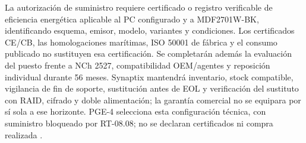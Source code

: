 La autorización de suministro requiere certificado o registro verificable de eficiencia energética aplicable al PC configurado y a MDF2701W-BK, identificando esquema, emisor, modelo, variantes y condiciones. Los certificados CE/CB, las homologaciones marítimas, ISO 50001 de fábrica y el consumo publicado no sustituyen esa certificación. Se completarán además la evaluación del puesto frente a NCh 2527, compatibilidad OEM/agentes y reposición individual durante 56 meses. Synaptix mantendrá inventario, stock compatible, vigilancia de fin de soporte, sustitución antes de EOL y verificación del sustituto con RAID, cifrado y doble alimentación; la garantía comercial no se equipara por sí sola a ese horizonte. PGE-4 selecciona esta configuración técnica, con suministro bloqueado por RT-08.08; no se declaran certificados ni compra realizada \parencite[RT-08.08/13, p.~19]{pucv-transversal}.
